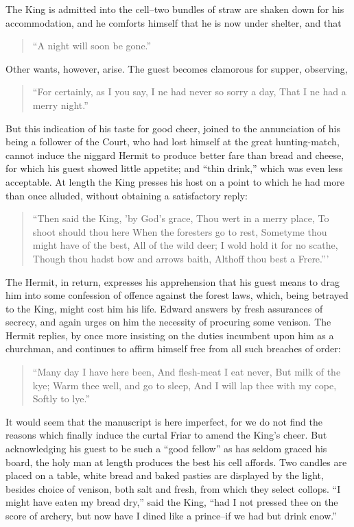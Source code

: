 The King is admitted into the cell--two bundles of straw are shaken down
for his accommodation, and he comforts himself that he is now under
shelter, and that

\begin{quote}
``A night will soon be gone.''
\end{quote}

Other wants, however, arise. The guest becomes clamorous for supper,
observing,

\begin{quote}
``For certainly, as I you say,
I ne had never so sorry a day,
That I ne had a merry night.''
\end{quote}

But this indication of his taste for good cheer, joined to the
annunciation of his being a follower of the Court, who had lost himself
at the great hunting-match, cannot induce the niggard Hermit to produce
better fare than bread and cheese, for which his guest showed little
appetite; and ``thin drink,'' which was even less acceptable. At length
the King presses his host on a point to which he had more than once
alluded, without obtaining a satisfactory reply:

\begin{quote}
``Then said the King, 'by God's grace,
Thou wert in a merry place,
To shoot should thou here
When the foresters go to rest,
Sometyme thou might have of the best,
All of the wild deer;
I wold hold it for no scathe,
Though thou hadst bow and arrows baith,
Althoff thou best a Frere.'''
\end{quote}

The Hermit, in return, expresses his apprehension that his guest means
to drag him into some confession of offence against the forest laws,
which, being betrayed to the King, might cost him his life. Edward
answers by fresh assurances of secrecy, and again urges on him the
necessity of procuring some venison. The Hermit replies, by once more
insisting on the duties incumbent upon him as a churchman, and continues
to affirm himself free from all such breaches of order:

\begin{quote}
``Many day I have here been,
And flesh-meat I eat never,
But milk of the kye;
Warm thee well, and go to sleep,
And I will lap thee with my cope,
Softly to lye.''
\end{quote}

It would seem that the manuscript is here imperfect, for we do not find
the reasons which finally induce the curtal Friar to amend the King's
cheer. But acknowledging his guest to be such a ``good fellow'' as has
seldom graced his board, the holy man at length produces the best his
cell affords. Two candles are placed on a table, white bread and baked
pasties are displayed by the light, besides choice of venison, both salt
and fresh, from which they select collops. ``I might have eaten my bread
dry,'' said the King, ``had I not pressed thee on the score of archery,
but now have I dined like a prince--if we had but drink enow.''

